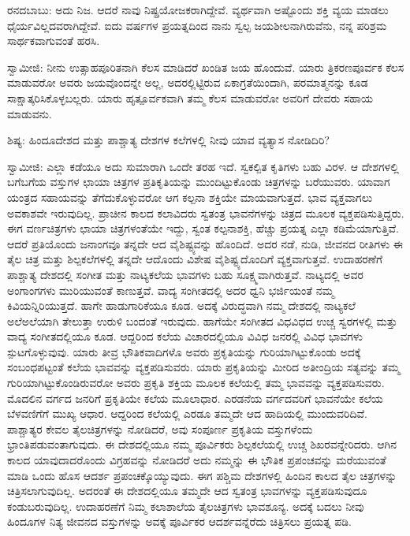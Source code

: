ರನದಬಾಬು: ಅದು ನಿಜ. ಆದರೆ ನಾವು ನಿಷ್ಪ್ರಯೋಜಕರಾಗಿದ್ದೇವೆ. ವ್ಯರ್ಥವಾಗಿ ಅಷ್ಟೊಂದು ಶಕ್ತಿ ವ್ಯಯ ಮಾಡಲು ಧೈರ್ಯವಿಲ್ಲದವರಾಗಿದ್ದೇವೆ. ಐದು ವರ್ಷಗಳ ಪ್ರಯತ್ನದಿಂದ ನಾನು ಸ್ವಲ್ಪ ಜಯಶೀಲನಾಗಿರುವೆನು, ನನ್ನ ಪರಿಶ್ರಮ ಸಾರ್ಥಕವಾಗುವಂತೆ ಹರಸಿ.

ಸ್ವಾಮೀಜಿ: ನೀನು ಉತ್ಸಾಹಪೂರಿತನಾಗಿ ಕೆಲಸ ಮಾಡಿದರೆ ಖಂಡಿತ ಜಯ ಹೊಂದುವೆ. ಯಾರು ತ್ರಿಕರಣಪೂರ್ವಕ ಕೆಲಸ ಮಾಡುವರೋ ಅವರು ಜಯವೊಂದನ್ನೇ ಅಲ್ಲ, ಅದರಲ್ಲಿಟ್ಟಿರುವ ಏಕಾಗ್ರತೆಯಿಂದಾಗಿ, ಪರಮಾತ್ಮನನ್ನು ಕೂಡ ಸಾಕ್ಷಾತ್ಕರಿಸಿಕೊಳ್ಳಬಲ್ಲರು. ಯಾರು ಹೃತ್ಪೂರ್ವಕವಾಗಿ ತಮ್ಮ ಕೆಲಸ ಮಾಡುವರೋ ಅವರಿಗೆ ದೇವರು ಸಹಾಯ ಮಾಡುವನು.

ಶಿಷ್ಯ: ಹಿಂದೂದೇಶದ ಮತ್ತು ಪಾಶ್ಚಾತ್ಯ ದೇಶಗಳ ಕಲೆಗಳಲ್ಲಿ ನೀವು ಯಾವ ವ್ಯತ್ಯಾಸ ನೋಡಿದಿರಿ?

ಸ್ವಾಮೀಜಿ: ಎಲ್ಲಾ ಕಡೆಯೂ ಅದು ಸುಮಾರಾಗಿ ಒಂದೇ ತರಹ ಇದೆ. ಸ್ವಕಲ್ಪಿತ ಕೃತಿಗಳು ಬಹು ವಿರಳ. ಆ ದೇಶಗಳಲ್ಲಿ ಬಗೆಬಗೆಯ ವಸ್ತುಗಳ ಛಾಯಾ ಚಿತ್ರಗಳ ಪ್ರತಿಕೃತಿಯನ್ನು ಮುಂದಿಟ್ಟುಕೊಂಡು ಚಿತ್ರಗಳನ್ನು ಬರೆಯುವರು. ಯಾವಾಗ ಯಂತ್ರದ ಸಹಾಯವನ್ನು ತೆಗೆದುಕೊಳ್ಳುವರೋ ಆಗ ಕಲ್ಪನಾ ಶಕ್ತಿಯೇ ಮಾಯವಾಗುತ್ತದೆ. ಭಾವ ವ್ಯಕ್ತವಾಗಲು ಅವಕಾಶವೇ ಇರುವುದಿಲ್ಲ. ಪ್ರಾಚೀನ ಕಾಲದ ಕಲಾವಿದರು ಸ್ವತಂತ್ರ ಭಾವನೆಗಳನ್ನು ಚಿತ್ರದ ಮೂಲಕ ವ್ಯಕ್ತಪಡಿಸುತ್ತಿದ್ದರು. ಈಗ ವರ್ಣಚಿತ್ರಗಳು ಛಾಯಾ ಚಿತ್ರಗಳಂತೆಯೇ ಇದ್ದು, ಸ್ವಂತ ಕಲ್ಪನಾಶಕ್ತಿ, ಹೆಚ್ಚು ಪ್ರಯತ್ನ ಎಲ್ಲಾ ಕಡಿಮೆಯಾಗುತ್ತಿವೆ. ಆದರೆ ಪ್ರತಿಯೊಂದು ಜನಾಂಗವೂ ತನ್ನದೇ ಆದ ವೈಶಿಷ್ಟ್ಯವನ್ನು ಹೊಂದಿದೆ. ಅದರ ನಡೆ, ನುಡಿ, ಜೀವನದ ರೀತಿಗಳು ಈ ತೈಲ ಚಿತ್ರ ಮತ್ತು ಶಿಲ್ಪಕಲೆಗಳಲ್ಲಿ ತನ್ನದೇ ಆದೊಂದು ವಿಶೇಷ ವೈಶಿಷ್ಟ್ಯದೊಂದಿಗೆ ವ್ಯಕ್ತವಾಗುತ್ತವೆ. ಉದಾಹರಣೆಗೆ ಪಾಶ್ಚಾತ್ಯ ದೇಶದಲ್ಲಿ ಸಂಗೀತ ಮತ್ತು ನಾಟ್ಯಕಲೆಯ ಭಾವಗಳು ಬಹು ಸೂಕ್ಷ್ಮವಾಗಿರುತ್ತವೆ. ನಾಟ್ಯದಲ್ಲಿ ಅವರ ಅಂಗಾಂಗಗಳು ಮುರಿಯುವಂತೆ ಕಾಣುತ್ತವೆ. ವಾದ್ಯ ಸಂಗೀತದಲ್ಲಿ ಅದರ ಧ್ವನಿ ಭರ್ಜಿಯಂತೆ ನಮ್ಮ ಕಿವಿಯನ್ನಿರಿಯುತ್ತದೆ. ಹಾಗೇ ಹಾಡುಗಾರಿಕೆಯೂ ಕೂಡ. ಅದಕ್ಕೆ ವಿರುದ್ಧವಾಗಿ ನಮ್ಮ ದೇಶದಲ್ಲಿ ನಾಟ್ಯಕಲೆ ಅಲೆಅಲೆಯಾಗಿ ತೇಲುತ್ತಾ ಉರುಳಿ ಬಂದಂತೆ ಇರುವುದು. ಹಾಗೆಯೇ ಸಂಗೀತದ ವಿಧವಿಧದ ಉಚ್ಚ ಸ್ವರಗಳಲ್ಲಿ ಮತ್ತು ವಾದ್ಯ ಸಂಗೀತದಲ್ಲಿಯೂ ಕೂಡ. ಆದ್ದರಿಂದ ಕಲೆಯ ವಿಚಾರದಲ್ಲಿಯೂ ವಿವಿಧ ಜನರಲ್ಲಿ ವಿವಿಧ ಭಾವಗಳು ಸ್ಪುಟಗೊಳ್ಳುವುವು. ಯಾರು ತೀವ್ರ ಭೌತಿಕವಾದಿಗಳೊ ಅವರು ಪ್ರಕೃತಿಯನ್ನು ಗುರಿಯಾಗಿಟ್ಟುಕೊಂಡು ಅದಕ್ಕೆ ಸಂಬಂಧಪಟ್ಟಂತೆ ಕಲೆಯ ಭಾವವನ್ನು ವ್ಯಕ್ತಪಡಿಸುವರು. ಯಾರು ಪ್ರಕೃತಿಯನ್ನು ಮೀರಿದ ಅತೀಂದ್ರಿಯ ಸತ್ಯವನ್ನು ತಮ್ಮ ಗುರಿಯಾಗಿಟ್ಟುಕೊಂಡಿರುವರೋ ಅವರು ಪ್ರಕೃತಿ ಶಕ್ತಿಯ ಮೂಲಕ ಕಲೆಯಲ್ಲಿ ತಮ್ಮ ಭಾವವನ್ನು ವ್ಯಕ್ತಪಡಿಸುವರು. ಮೊದಲಿನ ವರ್ಗದ ಜನರಿಗೆ ಪ್ರಕೃತಿಯೇ ಕಲೆಯ ಮೂಲಾಧಾರ. ಎರಡನೆಯ ವರ್ಗದವರಿಗೆ ಭಾವನೆಯೇ ಕಲೆಯ ಬೆಳವಣಿಗೆಗೆ ಮುಖ್ಯ ಆಧಾರ. ಆದ್ದರಿಂದ ಕಲೆಯಲ್ಲಿ ಎರಡೂ ತಮ್ಮದೇ ಆದ ಹಾದಿಯಲ್ಲಿ ಮುಂದುವರಿದಿವೆ. ಪಾಶ್ಚಾತ್ಯರ ಕೇವಲ ತೈಲಚಿತ್ರಗಳನ್ನು ನೋಡಿದರೆ, ಅವು ಸಂಪೂರ್ಣ ಪ್ರಕೃತಿಯ ವಸ್ತುಗಳೆಂದು ಭ್ರಾಂತಿಪಡುವಂತಾಗುವುದು. ಈ ದೇಶದಲ್ಲಿಯೂ ನಮ್ಮ ಪೂರ್ವಿಕರು ಶಿಲ್ಪಕಲೆಯಲ್ಲಿ ಉಚ್ಚ ಶಿಖರವನ್ನೇರಿದರು. ಆಗಿನ ಕಾಲದ ಯಾವುದಾದರೊಂದು ವಿಗ್ರಹವನ್ನು ನೋಡಿದರೆ ಅದು ನಮ್ಮನ್ನು ಈ ಭೌತಿಕ ಪ್ರಪಂಚವನ್ನು ಮರೆಯುವಂತೆ ಮಾಡಿ ಒಂದು ಹೊಸ ಆದರ್ಶ ಪ್ರಪಂಚಕ್ಕೊಯ್ಯುವುದು. ಈಗ ಪಶ್ಚಿಮ ದೇಶಗಳಲ್ಲಿ ಹಿಂದಿನ ಕಾಲದ ತೈಲ ಚಿತ್ರಗಳನ್ನು ಚಿತ್ರಿಸಲಾಗುವುದಿಲ್ಲ. ಅದರಂತೆ ಈ ದೇಶದಲ್ಲಿಯೂ ತಮ್ಮದೇ ಆದ ಸ್ವತಂತ್ರ ಭಾವಗಳನ್ನು ವ್ಯಕ್ತಪಡಿಸುವುದೂ ಕಂಡುಬರುವುದಿಲ್ಲ. ಉದಾಹರಣೆಗೆ ನಿಮ್ಮ ಕಲಾಶಾಲೆಯ ತೈಲಚಿತ್ರಗಳು ಭಾವಶೂನ್ಯ. ಅದಕ್ಕೆ ಬದಲು ನೀವು ಹಿಂದೂಗಳ ನಿತ್ಯ ಜೀವನದ ವಸ್ತುಗಳನ್ನು ಅವಕ್ಕೆ ಪೂರ್ವಿಕರ ಆದರ್ಶವನ್ನೆರೆದು ಚಿತ್ರಿಸಲು ಪ್ರಯತ್ನ ಪಡಿ.

